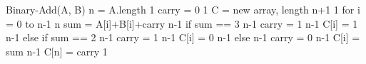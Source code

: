 Binary-Add(A, B)				
	n = A.length					1
	carry = 0					1
	C =  new array, length n+1	1
	for i = 0 to n-1				n
		sum = A[i]+B[i]+carry	n-1
		if sum == 3				n-1
			carry = 1			n-1
			C[i] = 1				n-1
		else if sum == 2			n-1
			carry = 1			n-1
			C[i] = 0				n-1
		else						n-1
			carry = 0			n-1
			C[i] = sum			n-1
	C[n] = carry					1